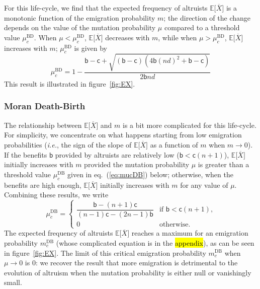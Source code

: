 \documentclass[11pt, letterpaper]{article}
\renewcommand{\eqref}[1]{\textup{{\normalfont eq.~(\ref{#1}}\normalfont)}}
\newcommand{\ie}{\textit{i.e.}}
\newcommand{\Esp}[1]{\mathbb{E}\big[ #1\big]}%
\newcommand{\bb}{\mathsf{b}}
\newcommand{\cc}{\mathsf{c}}
\newcommand{\BD}{\textrm{BD}}
\newcommand{\DB}{\textrm{DB}}
\begin{document}
For this life-cycle, we find that the expected frequency of altruists $\Esp{\overline{X}}$ is a monotonic function of the emigration probability $m$; the direction of the change depends on the value of the mutation probability $\mu$ compared to a threshold value $\mu_c^{\BD}$. When $\mu<\mu_c^{\BD}$, $\Esp{\overline{X}}$ decreases with $m$, while when $\mu>\mu_c^{\BD}$, $\Esp{\overline{X}}$  increases with $m$; $\mu_c^{\BD}$ is given by 
\begin{equation}\label{eq:mucBD}
\mu_c^{\BD} = %
1 - \frac{\bb  - \cc + \sqrt{(\bb - \cc) \left(4 \bb (n d)^2 + \bb - \cc \right)} }{2 \bb n d}
\end{equation}
%
This result is illustrated in figure~\ref{fig:EX}.


\subsubsection{Moran Death-Birth}

The relationship between $\Esp{\overline{X}}$ and $m$ is a bit more complicated for this life-cycle. For simplicity, we concentrate on what happens starting from low emigration probabilities (\ie, the sign of the slope of $\Esp{\overline{X}}$ as a function of $m$ when $m\to 0$). If the benefits $\bb$ provided by altruists are relatively low ($\bb < \cc (n+1)$), $\Esp{\overline{X}}$ initially increases with $m$ provided the mutation probability $\mu$ is greater than a threshold value $\mu_c^{\DB}$ given in \eqref{eq:mucDB} below; otherwise, when the benefits are high enough, $\Esp{\overline{X}}$ initially increases with $m$ for any value of $\mu$. Combining these results, we write
\begin{equation}\label{eq:mucDB}
\mu_c^{\DB} = \begin{cases}
\dfrac{\bb -  (n+1) \cc}{ (n-1) \cc - (2 n - 1) \bb} & \textrm{if $\bb < \cc (n+1)$,} \\
%
0 & \textrm{otherwise. }
\end{cases}
\end{equation} 
The expected frequency of altruists $\Esp{\overline{X}}$ reaches a maximum for an emigration probability $m_c^{\DB}$ (whose complicated equation is in the \hl{appendix}), as can be seen in figure~\ref{fig:EX}. The limit of this critical emigration probability $m_c^{\DB}$ when $\mu \to 0$ is $0$: we recover the result that more emigration is detrimental to the evolution of altruism when the mutation probability is either null or vanishingly small. 
\end{document}

